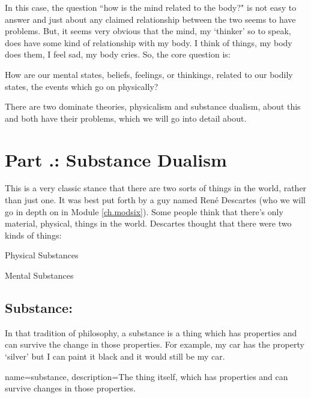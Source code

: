 In this case, the question ``how is the mind related to the body?" is not easy to answer and just about any claimed relationship between the two seems to have problems. But, it seems very obvious that the mind, my `thinker' so to speak, does have some kind of relationship with my body. I think of things, my body does them, I feel sad, my body cries. So, the core question is:

\begin{center}How are our mental states, beliefs, feelings, or thinkings, related to our bodily states, the events which go on physically?\end{center}

There are two dominate theories, \gls{physicalism} and \gls{substance dualism}, about this and both have their problems, which we will go into detail about.

\section{Part \thechapcount.\theseccount:  Substance Dualism}

This is a very classic stance that there are two sorts of things in the world, rather than just one. It was best put forth by a guy named Ren\'e Descartes (who we will go in depth on in Module \ref{ch.modsix}). Some people think that there’s only material, physical, things in the world. Descartes thought that there were two kinds of things:
\begin{earg}
    \item[]Physical Substances
    \item[]Mental Substances
\end{earg}
\subsection{Substance:}

In that tradition of philosophy, a \gls{substance} is a thing which has properties and can survive the change in those properties. For example, my car has the property ‘silver’ but I can paint it black and it would still be my car.

{
name=substance,
description={The thing itself, which has properties and can survive changes in those properties.}
}


